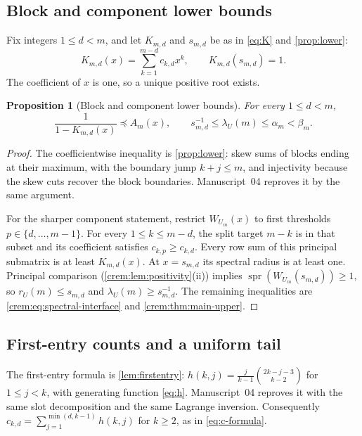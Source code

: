\documentclass[11pt,a4paper]{article}
\newtheorem{proposition}[proposition]{Proposition}
\theoremstyle{definition}\newaliascnt{definition}{theorem}
\theoremstyle{remark}\newaliascnt{remark}{theorem}
\newcommand{\spr}{\operatorname{spr}}
\newcommand{\preceqc}{\preceq}
\begin{document}
\subsection{Block and component lower bounds}
Fix integers $1\le d<m$, and let $K_{m,d}$ and $s_{m,d}$ be as in
\eqref{eq:K} and \cref{prop:lower}:
\begin{equation}
 K_{m,d}(x)=\sum_{k=1}^{m-d}c_{k,d}x^k,
 \qquad K_{m,d}(s_{m,d})=1.
 \label{crem:eq:block-root}
\end{equation}
The coefficient of $x$ is one, so a unique positive root exists.

\begin{proposition}[Block and component lower bounds]\label{crem:prop:block-lower}
For every $1\le d<m$,
\begin{equation}
 \frac1{1-K_{m,d}(x)}\preceqc A_m(x),
 \qquad s_{m,d}^{-1}\le\lambda_U(m)\le\alpha_m<\beta_m.
 \label{crem:eq:corridor}
\end{equation}
\end{proposition}
\begin{proof}
The coefficientwise inequality is \cref{prop:lower}: skew sums of blocks
ending at their maximum, with the boundary jump $k+j\le m$, and injectivity
because the skew cuts recover the block boundaries. Manuscript~04 reproves it
by the same argument.

For the sharper component statement, restrict $W_{U_m}(x)$ to first
thresholds $p\in\{d,\ldots,m-1\}$. For every $1\le k\le m-d$, the split
target $m-k$ is in that subset and its coefficient satisfies
$c_{k,p}\ge c_{k,d}$. Every row sum of this principal submatrix is at least
$K_{m,d}(x)$. At $x=s_{m,d}$ its spectral radius is at least one. Principal
comparison (\cref{crem:lem:positivity}(ii)) implies
$\spr(W_{U_m}(s_{m,d}))\ge1$, so $r_U(m)\le s_{m,d}$ and
$\lambda_U(m)\ge s_{m,d}^{-1}$. The remaining inequalities are
\eqref{crem:eq:spectral-interface} and \cref{crem:thm:main-upper}.
\end{proof}

\subsection{First-entry counts and a uniform tail}
The first-entry formula is \cref{lem:firstentry}:
$h(k,j)=\frac{j}{k-1}\binom{2k-j-3}{k-2}$ for $1\le j<k$, with generating
function \eqref{eq:h}. Manuscript~04 reproves it with the same slot
decomposition and the same Lagrange inversion. Consequently
$c_{k,d}=\sum_{j=1}^{\min(d,k-1)}h(k,j)$ for $k\ge2$, as in
\eqref{eq:c-formula}.
\end{document}
